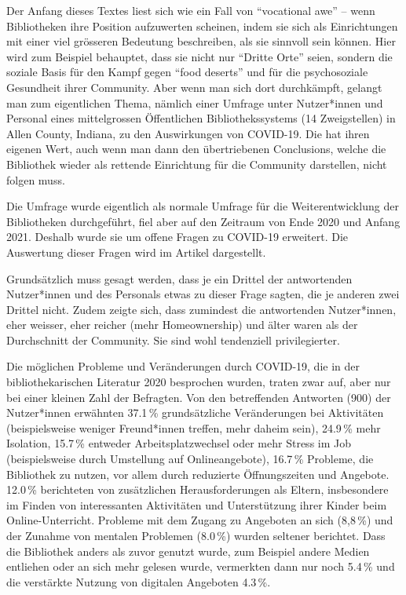 \documentclass[a4paper,
fontsize=11pt,
oneside,
numbers=noperiodatend,
parskip=half-,
bibliography=totoc,
final
]{scrartcl}
\begin{document}
Der Anfang dieses Textes liest sich wie ein Fall von \enquote{vocational
awe} -- wenn Bibliotheken ihre Position aufzuwerten scheinen, indem sie
sich als Einrichtungen mit einer viel grösseren Bedeutung beschreiben,
als sie sinnvoll sein können. Hier wird zum Beispiel behauptet, dass sie
nicht nur \enquote{Dritte Orte} seien, sondern die soziale Basis für den
Kampf gegen \enquote{food deserts} und für die psychosoziale Gesundheit
ihrer Community. Aber wenn man sich dort durchkämpft, gelangt man zum
eigentlichen Thema, nämlich einer Umfrage unter Nutzer*innen und
Personal eines mittelgrossen Öffentlichen Bibliothekssystems (14
Zweigstellen) in Allen County, Indiana, zu den Auswirkungen von
COVID-19. Die hat ihren eigenen Wert, auch wenn man dann den
übertriebenen Conclusions, welche die Bibliothek wieder als rettende
Einrichtung für die Community darstellen, nicht folgen muss.

Die Umfrage wurde eigentlich als normale Umfrage für die
Weiterentwicklung der Bibliotheken durchgeführt, fiel aber auf den
Zeitraum von Ende 2020 und Anfang 2021. Deshalb wurde sie um offene
Fragen zu COVID-19 erweitert. Die Auswertung dieser Fragen wird im
Artikel dargestellt.

Grundsätzlich muss gesagt werden, dass je ein Drittel der antwortenden
Nutzer*innen und des Personals etwas zu dieser Frage sagten, die je
anderen zwei Drittel nicht. Zudem zeigte sich, dass zumindest die
antwortenden Nutzer*innen, eher weisser, eher reicher (mehr
Homeownership) und älter waren als der Durchschnitt der Community. Sie
sind wohl tendenziell privilegierter.

Die möglichen Probleme und Veränderungen durch COVID-19, die in der
bibliothekarischen Literatur 2020 besprochen wurden, traten zwar auf,
aber nur bei einer kleinen Zahl der Befragten. Von den betreffenden
Antworten (900) der Nutzer*innen erwähnten 37.1\,\% grundsätzliche
Veränderungen bei Aktivitäten (beispielsweise weniger Freund*innen
treffen, mehr daheim sein), 24.9\,\% mehr Isolation, 15.7\,\% entweder
Arbeitsplatzwechsel oder mehr Stress im Job (beispielsweise durch
Umstellung auf Onlineangebote), 16.7\,\% Probleme, die Bibliothek zu
nutzen, vor allem durch reduzierte Öffnungszeiten und Angebote. 12.0\,\%
berichteten von zusätzlichen Herausforderungen als Eltern, insbesondere
im Finden von interessanten Aktivitäten und Unterstützung ihrer Kinder
beim Online-Unterricht. Probleme mit dem Zugang zu Angeboten an sich
(8,8\,\%) und der Zunahme von mentalen Problemen (8.0\,\%) wurden
seltener berichtet. Dass die Bibliothek anders als zuvor genutzt wurde,
zum Beispiel andere Medien entliehen oder an sich mehr gelesen wurde,
vermerkten dann nur noch 5.4\,\% und die verstärkte Nutzung von
digitalen Angeboten 4.3\,\%.
\end{document}
